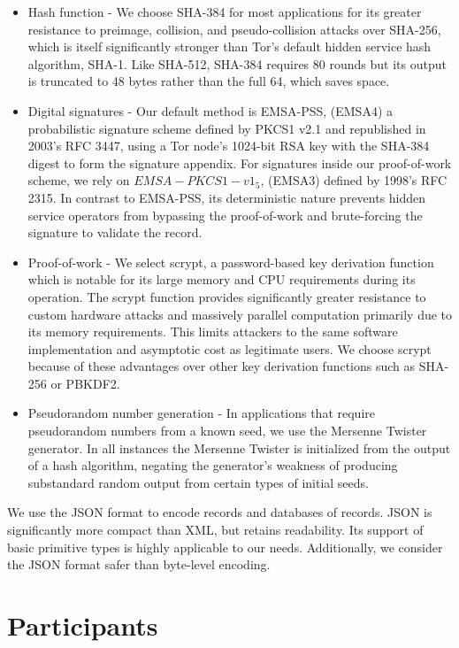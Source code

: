 \begin{itemize}
	\item Hash function - We choose SHA-384 for most applications for its greater resistance to preimage, collision, and pseudo-collision attacks over SHA-256, which is itself significantly stronger than Tor's default hidden service hash algorithm, SHA-1. Like SHA-512, SHA-384 requires 80 rounds but its output is truncated to 48 bytes rather than the full 64, which saves space.
	\item Digital signatures - Our default method is EMSA-PSS, (EMSA4) a probabilistic signature scheme defined by PKCS1 v2.1 and republished in 2003's RFC 3447, using a Tor node's 1024-bit RSA key with the SHA-384 digest to form the signature appendix. For signatures inside our proof-of-work scheme, we rely on $EMSA-PKCS1-v1_5$, (EMSA3) defined by 1998's RFC 2315. In contrast to EMSA-PSS, its deterministic nature prevents hidden service operators from bypassing the proof-of-work and brute-forcing the signature to validate the record.
	\item Proof-of-work - We select scrypt, a password-based key derivation function which is notable for its large memory and CPU requirements during its operation. The scrypt function provides significantly greater resistance to custom hardware attacks and massively parallel computation primarily due to its memory requirements. This limits attackers to the same software implementation and asymptotic cost as legitimate users.\cite{percival2009stronger} We choose scrypt because of these advantages over other key derivation functions such as SHA-256 or PBKDF2.
	\item Pseudorandom number generation - In applications that require pseudorandom numbers from a known seed, we use the Mersenne Twister generator. In all instances the Mersenne Twister is initialized from the output of a hash algorithm, negating the generator's weakness of producing substandard random output from certain types of initial seeds.
\end{itemize}

We use the JSON format to encode records and databases of records. JSON is significantly more compact than XML, but retains readability. Its support of basic primitive types is highly applicable to our needs. Additionally, we consider the JSON format safer than byte-level encoding.

\section{Participants}

